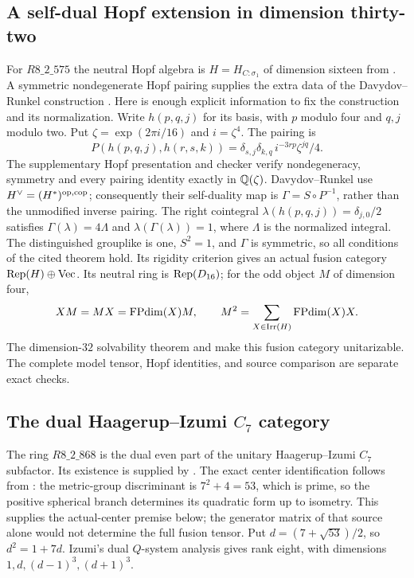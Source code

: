 \subsection{A self-dual Hopf extension in dimension thirty-two}
For $R8\_2\_575$ the neutral Hopf algebra is
$H=H_{C:\sigma_1}$ of dimension sixteen from \cite{Kashina}. A
symmetric nondegenerate Hopf pairing supplies the extra data of the
Davydov--Runkel construction \cite[Theorem~2.5]{DavydovRunkel}.
Here is enough explicit information to fix the construction and its
normalization. Write $h(p,q,j)$ for its basis, with $p$ modulo four
and $q,j$ modulo two. Put $\zeta=\exp(2\pi i/16)$ and $i=\zeta^4$.
The pairing is
\[
P(h(p,q,j),h(r,s,k))
 =\delta_{s,j}\delta_{k,q}\,i^{-3rp}\zeta^{jq}/4.
\]
The supplementary Hopf presentation and checker verify nondegeneracy,
symmetry and every pairing identity exactly in $\mathbb Q(\zeta)$.
Davydov--Runkel use $H^\vee=(H^*)^{\rm op,cop}$; consequently their
self-duality map is $\Gamma=S\circ P^{-1}$, rather than the
unmodified inverse pairing. The right cointegral
$\lambda(h(p,q,j))=\delta_{j,0}/2$ satisfies
$\Gamma(\lambda)=4\Lambda$ and
$\lambda(\Gamma(\lambda))=1$, where $\Lambda$ is the normalized
integral. The distinguished grouplike is one, $S^2=1$, and $\Gamma$
is symmetric, so all conditions of the cited theorem hold.
Its rigidity criterion \cite[Proposition~3.25]{DavydovRunkel} gives
an actual fusion category $\operatorname{Rep}(H)\oplus\operatorname{Vec}$. Its neutral ring is
$\operatorname{Rep}(D_{16})$; for the odd object $M$ of dimension four,
\[
X M=M X=\operatorname{FPdim}(X)M,\qquad
M^2=\sum_{X\in\operatorname{Irr}(H)}\operatorname{FPdim}(X)X.
\]
The dimension-$32$ solvability theorem and
\cite[Theorem~5.20]{GHR} make this fusion category unitarizable.
The complete model tensor, Hopf identities, and source comparison are
separate exact checks.

\subsection{The dual Haagerup--Izumi \texorpdfstring{$C_7$}{C7} category}
\label{sec:hi7dual}
The ring $R8\_2\_868$ is the dual even part of the unitary
Haagerup--Izumi $C_7$ subfactor. Its existence is supplied by
\cite[Theorem~5(d)]{EvansGannon}. The exact center identification follows
from \cite[Theorem~A(2), proved as Theorem~5.1]{GSYOddHI2026}:
the metric-group discriminant is $7^2+4=53$, which is prime, so the
positive spherical branch determines its quadratic form up to isometry.
This supplies the actual-center premise below; the generator matrix
of that source alone would not determine the full fusion tensor. Put
$d=(7+\sqrt{53})/2$, so $d^2=1+7d$.
Izumi's dual $Q$-system analysis
\cite[Proposition~7.4 and Theorem~7.5]{Izumi3n} gives rank eight,
with dimensions $1,d,(d-1)^3,(d+1)^3$.

